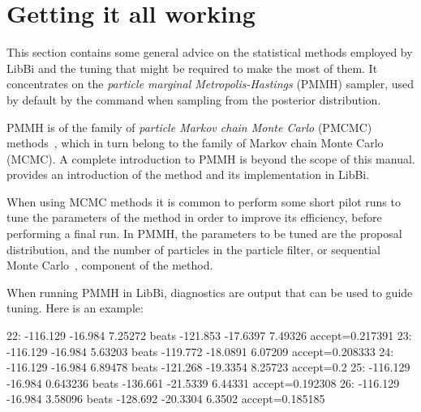 \section{Getting it all working\label{Getting it all working}}

This section contains some general advice on the statistical methods employed
by LibBi and the tuning that might be required to make the most of them. It
concentrates on the \emph{particle marginal
  Metropolis-Hastings} (PMMH) sampler, used by
default by the  command when sampling from the posterior
distribution.

PMMH is of the family of \emph{particle Markov chain Monte Carlo} (PMCMC)
methods~\citep{Andrieu2010}, which in turn belong to the family of Markov
chain Monte Carlo (MCMC). A complete
introduction to PMMH is beyond the scope of this manual. \citet{Murray2013b}
provides an introduction of the method and its implementation in LibBi.

When using MCMC methods it is common to perform some short pilot runs to tune
the parameters of the method in order to improve its efficiency, before
performing a final run. In PMMH, the parameters to be tuned are the proposal
distribution, and the number of particles in the particle filter, or
sequential Monte Carlo~\citep{Doucet2001}, component of the method.

When running PMMH in LibBi, diagnostics are output that can be used to guide
tuning. Here is an example:

{\scriptsize\begin{cmdcode}
22: -116.129  -16.984  7.25272  beats -121.853  -17.6397  7.49326  accept=0.217391
23: -116.129  -16.984  5.63203  beats -119.772  -18.0891  6.07209  accept=0.208333
24: -116.129  -16.984  6.89478  beats -121.268  -19.3354  8.25723  accept=0.2
25: -116.129  -16.984  0.643236 beats -136.661  -21.5339  6.44331  accept=0.192308
26: -116.129  -16.984  3.58096  beats -128.692  -20.3304  6.3502   accept=0.185185
\end{cmdcode}}

